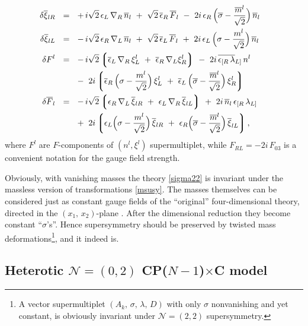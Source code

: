 \documentclass[12pt]{article}
\newcommand{\ntwot}{${\mathcal N}= \left(2,2\right) $ }
\newcommand{\ntwoo}{${\mathcal N}= \left(0,2\right) $ }
\newcommand{\ov}{\overline}
\newcommand{\lgr}{\left\lgroup}
\newcommand{\rgr}{\right\rgroup}
\newcommand{\CPC}{CP($N-1$)$\times$C }
\newcommand{\eer}{\epsilon_R}
\newcommand{\eel}{\epsilon_L}
\newcommand{\beer}{\ov{\epsilon}{}_R}
\newcommand{\beel}{\ov{\epsilon}{}_L}
\begin{document}
\begin{align}
     \\
%
\notag
  \delta\ov{\xi}{}_{lR} & ~~=~~
     +\, i\sqrt{2}\, \eel\, \nabla_R\, \ov{n}{}_l 
     ~+~ \sqrt{2}\, \beer\, \ov{F}{}_l 
     ~-~ 2i\, \eer\, \Bigl(\ov{\sigma} - \frac{\ov{m}{}^l}{\sqrt{2}}\Bigr)\, \ov{n}{}_l
     \\
%
\notag
  \delta\ov{\xi}{}_{lL} & ~~=~~
     -\, i\sqrt{2}\, \eer\, \nabla_L\, \ov{n}{}_l
     ~+~ \sqrt{2}\, \beel\, \ov{F}{}_l
     ~+~ 2i\, \eel\, \Bigl(\sigma - \frac{m^l}{\sqrt{2}}\Bigr)\, \ov{n}{}_l
     \\
%
\notag
  \delta F^l & ~~=~~
     -\,i\sqrt{2} \lgr \beel\, \nabla_R\, \xi_L^l ~+~ \beer\, \nabla_L \xi_R^l \rgr
     ~-~ 2i\, \ov{\epsilon_{[R}\, \lambda}{}_{L]}\, n^l
     \\
\notag
     & \phantom{~~=~~}
     ~-~ 2i \lgr \beer\, \Bigl(\sigma - \frac{m^l}{\sqrt{2}}\Bigr)\, \xi_L^l 
             ~+~ \beel\, \Bigl(\ov{\sigma} - \frac{\ov{m}{}^l}{\sqrt{2}}\Bigr)\, \xi_R^l \rgr 
     \\
%
\notag
  \delta \ov{F}{}_l & ~~=~~
     -\,i\sqrt{2} \lgr \eer\, \nabla_L\, \ov{\xi}{}_{lR} ~+~ 
                       \eel\, \nabla_R\, \ov{\xi}{}_{lL} \rgr
     ~+~ 2i\,\ov{n}{}_l\, \epsilon_{[R}\, \lambda_{L]} 
     \\
\notag
     & \phantom{~~=~~}
     ~+~ 2i \lgr \eel \Bigl(\sigma - \frac{m^l}{\sqrt{2}}\Bigr)\, \ov{\xi}{}_{lR} 
             ~+~ \eer \Bigl(\ov{\sigma} - \frac{\ov{m}{}^l}{\sqrt{2}}\Bigr)\, 
                            \ov{\xi}_{lL} \rgr ,
\end{align}
where $F^l$ are $F$-components of $(n^l,\xi^l)$
supermultiplet, while $F_{RL}=-2i\,F_{03}$ is a
convenient notation for the gauge field
strength.

	Obviously, with vanishing masses the theory \eqref{sigma22} is invariant
	under the massless version of transformations \eqref{msusy}.
	The masses themselves can be considered just as constant gauge fields of
	the ``original'' four-dimensional theory, directed in the $ (x_1,\, x_2) $-plane \cite{HaHo,Dorey}.
	After the dimensional reduction they become constant ``$\sigma$'s''.
	Hence supersymmetry should be preserved by twisted mass deformations\footnote{
          A vector supermultiplet $(A_k,\,\sigma,\,\lambda,\,D)$ with only 
          $ \sigma $ nonvanishing and yet constant, is obviously invariant under \ntwot supersymmetry.}, 
	and it indeed is.

 

\subsection{ Heterotic \ntwoo \CPC  model}
\end{document}
